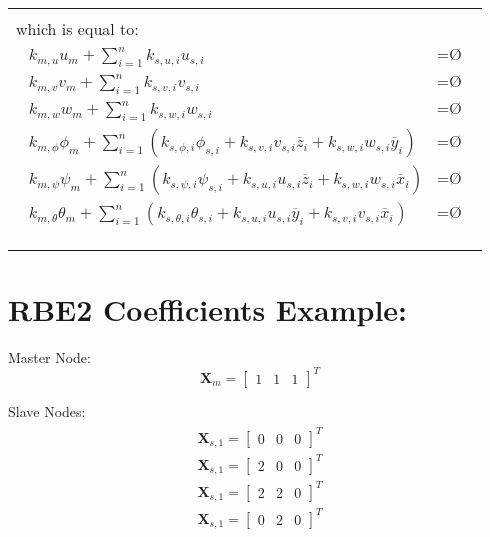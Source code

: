 \documentclass[10pt,b5paper,titlepage]{book}
\newcommand{\m}{\mathbf}
\newcommand{\Null}{\text{\O}}
\newenvironment{bbox}[1][0.96]
{
    \begin{center}
        \begin{tabular}{|p{#1\textwidth}|}
            \hline\\
}
{
            \\\\\hline
        \end{tabular}
    \end{center}
}
\newenvironment{eqarray}
{
    \begin{eqnarray}
        \begin{aligned}
}
{
        \end{aligned}
    \end{eqnarray}
}
\begin{document}
\begin{bbox}[0.95]
    which is equal to:
    \begin{eqarray}
        k_{m,u} u_m + \sum_{i=1}^n k_{s,u,i} u_{s,i} &= \Null \\
        k_{m,v} v_m + \sum_{i=1}^n k_{s,v,i} v_{s,i} &= \Null \\
        k_{m,w} w_m + \sum_{i=1}^n k_{s,w,i} w_{s,i} &= \Null \\
        k_{m,\phi} \phi_m + \sum_{i=1}^n
        \left(
            k_{s,\phi,i} \phi_{s,i}
            + k_{s,v,i} v_{s,i} \overline{z}_{i}
            + k_{s,w,i} w_{s,i} \overline{y}_{i}
    \right) &= \Null \\
        k_{m,\psi} \psi_m + \sum_{i=1}^n
        \left(
            k_{s,\psi,i} \psi_{s,i}
            + k_{s,u,i} u_{s,i} \overline{z}_{i}
            + k_{s,w,i} w_{s,i} \overline{x}_{i}
        \right) &= \Null \\
        k_{m,\theta} \theta_m + \sum_{i=1}^n
        \left(
            k_{s,\theta,i} \theta_{s,i}
            + k_{s,u,i} u_{s,i} \overline{y}_{i}
            + k_{s,v,i} v_{s,i} \overline{x}_{i}
        \right) &= \Null \\
    \end{eqarray}

\end{bbox}

\section{RBE2 Coefficients Example:}

Master Node:
\begin{equation}
    \m{X}_m =
    \begin{bmatrix}
        1 & 1 & 1
    \end{bmatrix}^T
\end{equation}

Slave Nodes:
\begin{eqarray}
    \m{X}_{s,1} =
    \begin{bmatrix}
        0 & 0 & 0
    \end{bmatrix}^T \\
    \m{X}_{s,1} =
    \begin{bmatrix}
        2 & 0 & 0
    \end{bmatrix}^T \\
    \m{X}_{s,1} =
    \begin{bmatrix}
        2 & 2 & 0
    \end{bmatrix}^T \\
    \m{X}_{s,1} =
    \begin{bmatrix}
        0 & 2 & 0
    \end{bmatrix}^T \\
\end{eqarray}
\end{document}
